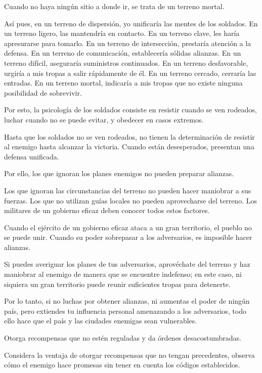 Cuando no haya ningún sitio a donde ir, se trata de un terreno mortal.

Así pues, en un terreno de dispersión, yo unificaría las mentes de los soldados. En un terreno ligero, las mantendría en contacto. En un terreno clave, les haría apresurarse para tomarlo. En un terreno de intersección, prestaría atención a la defensa. En un terreno de comunicación, establecería sólidas alianzas. En un terreno difícil, aseguraría suministros continuados. En un terreno desfavorable, urgiría a mis tropas a salir rápidamente de él. En un terreno cercado, cerraría las entradas. En un terreno mortal, indicaría a mis tropas que no existe ninguna posibilidad de sobrevivir.

Por esto, la psicología de los soldados consiste en resistir cuando se ven rodeados, luchar cuando no se puede evitar, y obedecer en casos extremos.

Hasta que los soldados no se ven rodeados, no tienen la determinación de resistir al enemigo hasta alcanzar la victoria. Cuando están desesperados, presentan una defensa unificada.

Por ello, los que ignoran los planes enemigos no pueden preparar alianzas.

Los que ignoran las circunstancias del terreno no pueden hacer maniobrar a sus fuerzas. Los que no utilizan guías locales no pueden aprovecharse del terreno. Los militares de un gobierno eficaz deben conocer todos estos factores.

Cuando el ejército de un gobierno eficaz ataca a un gran territorio, el pueblo no se puede unir. Cuando su poder sobrepasar a los adversarios, es imposible hacer alianzas.

Si puedes averiguar los planes de tus adversarios, aprovéchate del terreno y haz maniobrar al enemigo de manera que se encuentre indefenso; en este caso, ni siquiera un gran territorio puede reunir suficientes tropas para detenerte.

Por lo tanto, si no luchas por obtener alianzas, ni aumentas el poder de ningún país, pero extiendes tu influencia personal amenazando a los adversarios, todo ello hace que el país y las ciudades enemigas sean vulnerables.

Otorga recompensas que no estén reguladas y da órdenes desacostumbradas.

Considera la ventaja de otorgar recompensas que no tengan precedentes, observa cómo el enemigo hace promesas sin tener en cuenta los códigos establecidos.

